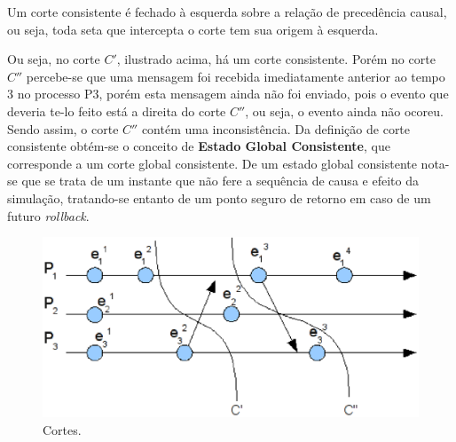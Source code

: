 	Um corte consistente é fechado à esquerda sobre a relação de precedência causal, ou seja, toda seta que intercepta o corte tem sua origem à esquerda.

	Ou seja, no corte $C'$, ilustrado acima, há um corte consistente. Porém no corte $C''$ percebe-se que uma mensagem foi recebida imediatamente anterior ao tempo 3 no processo P3, porém esta mensagem ainda não foi enviado, pois o evento que deveria te-lo feito está a direita do corte $C''$, ou seja, o evento ainda não ocoreu. Sendo assim, o corte $C''$ contém uma inconsistência.
	Da definição de corte consistente obtém-se o conceito de \textbf{Estado Global Consistente}, que corresponde a um corte global consistente. De um estado global consistente nota-se que se trata de um instante que não fere a sequência de causa e efeito da simulação, tratando-se entanto de um ponto seguro de retorno em caso de um futuro \textit{rollback}.
	
\begin{figure}
  \centerline{\includegraphics[scale=0.6]{cortes.eps}}
  \caption{Cortes.}
\label{fig:cortes}
\end{figure}
	
